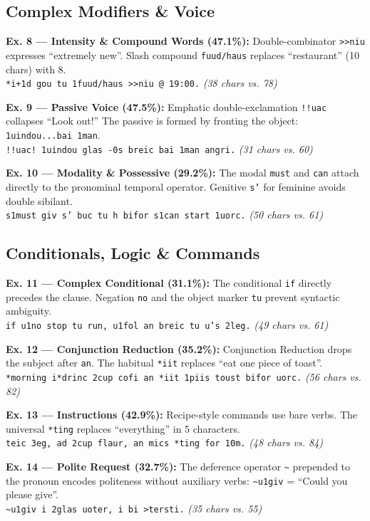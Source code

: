 \documentclass[10pt,twocolumn,letterpaper]{article}
\newcommand{\me}[1]{\texttt{#1}}
\begin{document}
\subsection{Complex Modifiers \& Voice}

\textbf{Ex. 8 --- Intensity \& Compound Words (47.1\%):} Double-combinator \me{>>niu} expresses ``extremely new''. Slash compound \me{fuud/haus} replaces ``restaurant'' (10 chars) with 8.\\
\me{*i+1d gou tu 1fuud/haus >>niu @ 19:00.} \textit{(38 chars vs. 78)}

\textbf{Ex. 9 --- Passive Voice (47.5\%):} Emphatic double-exclamation \me{!!uac} collapses ``Look out!'' The passive is formed by fronting the object: \me{1uindou...bai 1man}.\\
\me{!!uac! 1uindou glas -0s breic bai 1man angri.} \textit{(31 chars vs. 60)}

\textbf{Ex. 10 --- Modality \& Possessive (29.2\%):} The modal \me{must} and \me{can} attach directly to the pronominal temporal operator. Genitive \me{s'} for feminine avoids double sibilant.\\
\me{s1must giv s' buc tu h bifor s1can start 1uorc.} \textit{(50 chars vs. 61)}

\subsection{Conditionals, Logic \& Commands}

\textbf{Ex. 11 --- Complex Conditional (31.1\%):} The conditional \me{if} directly precedes the clause. Negation \me{no} and the object marker \me{tu} prevent syntactic ambiguity.\\
\me{if u1no stop tu run, u1fol an breic tu u's 2leg.} \textit{(49 chars vs. 61)}

\textbf{Ex. 12 --- Conjunction Reduction (35.2\%):} Conjunction Reduction drops the subject after \me{an}. The habitual \me{*iit} replaces ``eat one piece of toast''.\\
\me{*morning i*drinc 2cup cofi an *iit 1piis toust bifor uorc.} \textit{(56 chars vs. 82)}

\textbf{Ex. 13 --- Instructions (42.9\%):} Recipe-style commands use bare verbs. The universal \me{*ting} replaces ``everything'' in 5 characters.\\
\me{teic 3eg, ad 2cup flaur, an mics *ting for 10m.} \textit{(48 chars vs. 84)}

\textbf{Ex. 14 --- Polite Request (32.7\%):} The deference operator \me{\~{}} prepended to the pronoun encodes politeness without auxiliary verbs: \me{\~{}u1giv} = ``Could you please give''.\\
\me{\~{}u1giv i 2glas uoter, i bi >tersti.} \textit{(35 chars vs. 55)}
\end{document}
